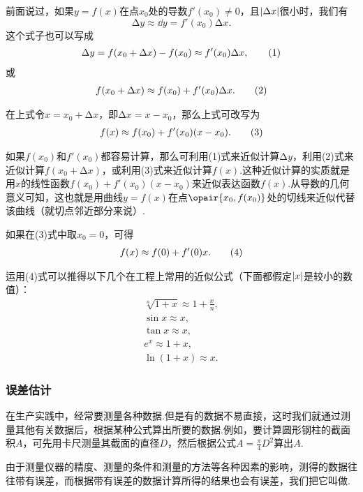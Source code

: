 前面说过，如果\(y=f(x)\)在点\(x_0\)处的导数\(f'(x_0)\neq0\)，且\(\abs{\Delta x}\)很小时，我们有\[
\increment y \approx\dd{y} = f'(x_0) \increment x.
\]这个式子也可以写成\begin{gather}
\increment y = f(x_0 + \increment x) - f(x_0) \approx f'(x_0) \increment x, \tag1
\end{gather}或\begin{gather}
f(x_0 + \increment x) \approx f(x_0) + f'(x_0) \increment x. \tag2
\end{gather}

在上式令\(x = x_0 + \increment x\)，即\(\increment x = x - x_0\)，那么上式可改写为\begin{gather}
f(x) \approx f(x_0) + f'(x_0) (x - x_0). \tag3
\end{gather}

如果\(f(x_0)\)和\(f'(x_0)\)都容易计算，那么可利用(1)式来近似计算\(\increment y\)，利用(2)式来近似计算\(f(x_0 + \increment x)\)，或利用(3)式来近似计算\(f(x)\).这种近似计算的实质就是用\(x\)的线性函数\(f(x_0) + f'(x_0) (x - x_0)\)来近似表达函数\(f(x)\).从导数的几何意义可知，这也就是用曲线\(y=f(x)\)在点\(\opair{x_0,f(x_0)}\)处的切线来近似代替该曲线（就切点邻近部分来说）.

如果在(3)式中取\(x_0 = 0\)，可得\begin{gather}
f(x) \approx f(0) + f'(0) x. \tag4
\end{gather}

运用(4)式可以推得以下几个在工程上常用的近似公式（下面都假定\(\abs{x}\)是较小的数值）：
\begin{gather}
\sqrt[n]{1+x} \approx 1 + \frac{x}{n}, \\
\sin x \approx x, \\
\tan x \approx x, \\
e^x \approx 1 + x, \\
\ln (1 + x) \approx x.
\end{gather}

\subsubsection{误差估计}
在生产实践中，经常要测量各种数据.但是有的数据不易直接，这时我们就通过测量其他有关数据后，根据某种公式算出所要的数据.例如，要计算圆形钢柱的截面积\(A\)，可先用卡尺测量其截面的直径\(D\)，然后根据公式\(A = \frac{\pi}{4} D^2\)算出\(A\).

由于测量仪器的精度、测量的条件和测量的方法等各种因素的影响，测得的数据往往带有误差，而根据带有误差的数据计算所得的结果也会有误差，我们把它叫做.

